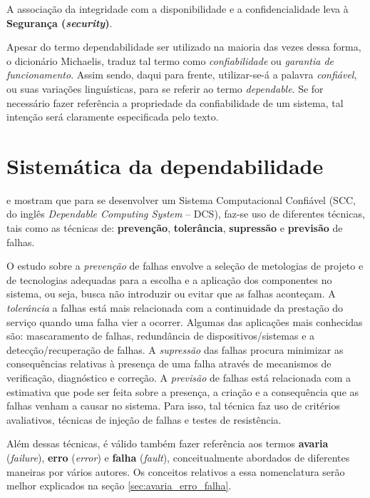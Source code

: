 A associação da integridade com a disponibilidade e a confidencialidade leva à
\textbf{Segurança (\textit{security})}.

Apesar do termo dependabilidade ser utilizado na maioria das vezes dessa forma,
o dicionário Michaelis, traduz tal termo como {\it confiabilidade} ou {\it
garantia de funcionamento}. Assim sendo, daqui para frente, utilizar-se-á a
palavra {\it confiável}, ou suas variações linguísticas, para se referir ao
termo {\it dependable}. Se for necessário fazer referência a propriedade da
confiabilidade de um sistema, tal intenção será claramente especificada pelo
texto.

\section{Sistemática da dependabilidade}
 e  mostram que para se
desenvolver um Sistema Computacional Confiável (SCC, do inglês {\it Dependable
Computing System} -- DCS), faz-se uso de diferentes técnicas, tais como as
técnicas de: {\bf prevenção}, {\bf tolerância}, {\bf supressão} e {\bf previsão}
de falhas.

O estudo sobre a {\it prevenção} de falhas envolve a seleção de metologias de
projeto e de tecnologias adequadas para a escolha e a aplicação dos componentes
no sistema, ou seja, busca não introduzir ou evitar que as falhas aconteçam. A
{\it tolerância} a falhas está mais relacionada com a continuidade da prestação
do serviço quando uma falha vier a ocorrer. Algumas das aplicações mais
conhecidas são: mascaramento de falhas, redundância de dispositivos/sistemas e a
detecção/recuperação de falhas. A {\it supressão} das falhas procura minimizar
as consequências relativas à presença de uma falha através de mecanismos de
verificação, diagnóstico e correção. A {\it previsão} de falhas está relacionada
com a estimativa que pode ser feita sobre a presença, a criação e a consequência
que as falhas venham a causar no sistema. Para isso, tal técnica faz uso de
critérios avaliativos, técnicas de injeção de falhas e testes de resistência.

Além dessas técnicas, é válido também fazer referência aos termos {\bf avaria}
({\it failure}), {\bf erro} ({\it error}) e {\bf falha} ({\it fault}),
conceitualmente abordados de diferentes maneiras por vários autores. Os
conceitos relativos a essa nomenclatura serão melhor explicados na seção
\ref{sec:avaria_erro_falha}.

